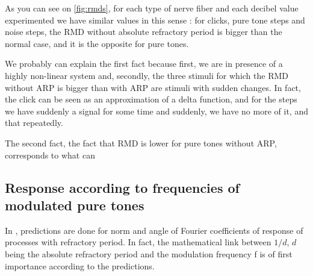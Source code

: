 As you can see on \autoref{fig:rmds}, for each type of nerve fiber and 
each decibel value experimented we have similar values in this sense :
for clicks, pure tone steps and noise steps, the RMD without absolute refractory
period is bigger than the normal case, and it is the opposite for pure tones.



We probably can explain the first fact because first, we are in presence of a highly 
non-linear system and, 
secondly, the three stimuli for which the RMD without ARP is bigger than with 
ARP are stimuli with sudden changes. 
In fact, the click can be seen as an approximation of a delta function, 
and for the steps we have suddenly a signal for some time and suddenly, 
we have no more of it, and that repeatedly. %

The second fact, the fact that RMD is lower for pure tones without ARP, 
corresponds to what can %

\subsection{Response according to frequencies of modulated pure tones}

In \cite{Deger}, predictions are done for norm and angle of Fourier coefficients of 
response of processes with refractory period.
In fact, the mathematical link between $1/d$, $d$ being the absolute refractory period
and the modulation frequency f is of first importance according to the predictions.







 
